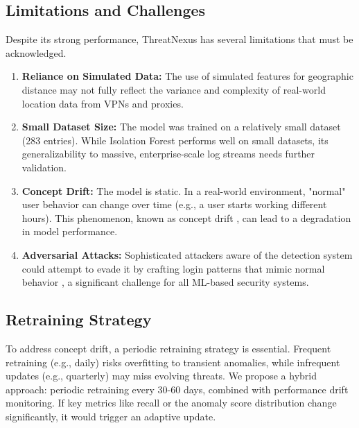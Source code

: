 \documentclass[conference]{IEEEtran}
\begin{document}
\subsection{Limitations and Challenges}
Despite its strong performance, ThreatNexus has several limitations that must be acknowledged.
\begin{enumerate}
    \item \textbf{Reliance on Simulated Data:} The use of simulated features for geographic distance may not fully reflect the variance and complexity of real-world location data from VPNs and proxies.
    \item \textbf{Small Dataset Size:} The model was trained on a relatively small dataset (283 entries). While Isolation Forest performs well on small datasets, its generalizability to massive, enterprise-scale log streams needs further validation.
    \item \textbf{Concept Drift:} The model is static. In a real-world environment, "normal" user behavior can change over time (e.g., a user starts working different hours). This phenomenon, known as concept drift \cite{gama2014survey}, can lead to a degradation in model performance.
    \item \textbf{Adversarial Attacks:} Sophisticated attackers aware of the detection system could attempt to evade it by crafting login patterns that mimic normal behavior \cite{carlini2019evaluating}, a significant challenge for all ML-based security systems.
\end{enumerate}

\subsection{Retraining Strategy}
To address concept drift, a periodic retraining strategy is essential. Frequent retraining (e.g., daily) risks overfitting to transient anomalies, while infrequent updates (e.g., quarterly) may miss evolving threats. We propose a hybrid approach: periodic retraining every 30-60 days, combined with performance drift monitoring. If key metrics like recall or the anomaly score distribution change significantly, it would trigger an adaptive update.
\end{document}
